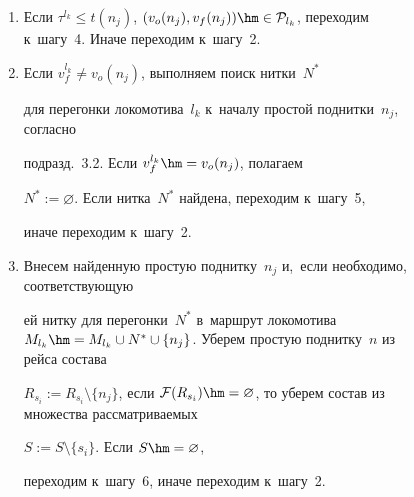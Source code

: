 \begin{multicols}{2}
\begin{figure}
\begin{enumerate}[1.]
        $i:=1$, $j:=1$ и~повторяем шаг~2; если $i\hm > |S|$, то переходим 


        к~следующему локомотиву $k := k+1$, $i:=1$, $j:=1$ и~повторяем шаг~2; 


        если $j\hm > |\mathcal F(R_s)|$, то переходим к~следующему составу 


        $i := i+1$, $j:=1$ и~повторяем шаг~2. Переходим к~шагу~3.


        


        \item


        Если $\tau^{l_k} \leqslant t(n_j)$, $(v_o(n_j), v_f(n_j))\hm \in 


        \mathcal P_{l_k}$, переходим к~шагу~4. Иначе переходим к~шагу~2.


        


        \item


        Если $v^{l_k}_f \ne v_o(n_j)$, выполняем поиск нитки~$N^*$ 


        для перегонки локомотива~$l_k$ к~началу простой поднитки~$n_j$, согласно 


        подразд.~3.2. Если $v^{l_k}_f \hm= v_o(n_j)$, полагаем 


        $N^*:=\varnothing$. Если нитка~$N^*$ найдена, переходим к~шагу~5, 


        иначе переходим к~шагу~2.





        \item


        Внесем найденную простую поднитку~$n_j$ и,~если необходимо, соответствующую 


        ей нитку для перегонки~$N^*$ в~маршрут локомотива $M_{l_k} \hm= M_{l_k} 


        \cup N^* \cup \{n_j\}$. Уберем простую поднитку~$n$ из рейса состава 


        $R_{s_i} := R_{s_i} \setminus \{n_j\}$, если $\mathcal F(R_{s_i})\hm = 


        \varnothing$, то уберем состав из множества рассматриваемых


         $S := S \setminus \{s_i\}$. Если $S \hm= \varnothing$, 


         переходим к~шагу~6, иначе переходим к~шагу~2.






\end{enumerate}
\end{figure}
\end{multicols}

